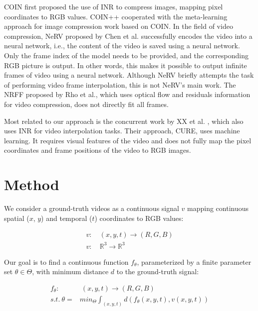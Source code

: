 \documentclass{article}
\begin{document}
COIN \cite{dupont2021coin} first proposed the use of INR to compress images, mapping pixel coordinates to RGB values.
COIN++ \cite{dupont2022coin++} cooperated with the meta-learning approach for image compression work based on COIN.
In the field of video compression, NeRV \cite{chen2021nerv} proposed by Chen et al. successfully encodes the video into a neural network, i.e., the content of the video is saved using a neural network.
Only the frame index of the model needs to be provided, and the corresponding RGB picture is output.
In other words, this makes it possible to output infinite frames of video using a neural network.
Although NeRV briefly attempts the task of performing video frame interpolation, this is not NeRV's main work.
The NRFF \cite{rho2022neural} proposed by Rho et al., which uses optical flow and residuals information for video compression, does not directly fit all frames.

Most related to our approach is the concurrent work by XX et al. \cite{shangguan2022learning}, which also uses INR for video interpolation tasks.
Their approach, CURE, uses machine learning.
It requires visual features of the video and does not fully map the pixel coordinates and frame positions of the video to RGB images.


\section{Method}

We consider a ground-truth videos as a continuous signal $v$ mapping continuous spatial ($x$, $y$) and temporal ($t$) coordinates to RGB values:

\begin{equation}
\begin{aligned}
v:& \: (x, y, t) \rightarrow (R, G, B) \\
v:& \: \mathbb{R}^3 \rightarrow \mathbb{R}^3
\end{aligned}
\end{equation}

Our goal is to find a continuous function $f_{\theta}$, parameterized by a finite parameter set $\theta \in \Theta$,
with minimum distance $d$ to the ground-truth signal:

\begin{equation}
\begin{aligned}
f_{\theta}:& \:(x, y, t) \rightarrow (R, G, B) \\
s.t. \: \theta =& min_{\Theta} \int_{(x,y,t)} d(f_{\theta}(x,y,t), v(x,y,t))
\end{aligned}
\end{equation}
\end{document}
